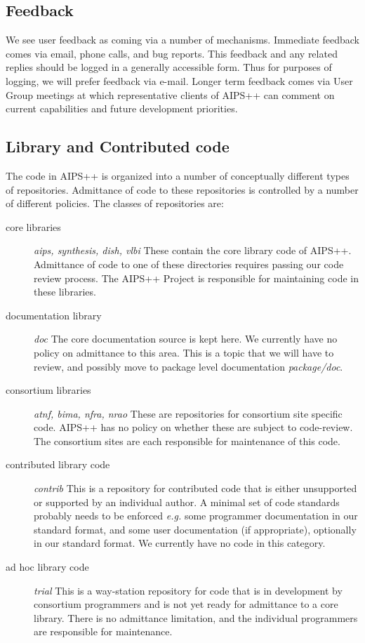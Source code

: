 \subsection{Feedback}

We see user feedback as coming via a number of mechanisms. Immediate
feedback comes via email, phone calls, and bug reports. This feedback
and any related replies should be logged in a generally accessible
form. Thus for purposes of logging, we will prefer feedback via
e-mail. Longer term feedback comes via User Group meetings at which
representative clients of AIPS++ can comment on current capabilities
and future development priorities.

\subsection{Library and Contributed code}

The code in AIPS++ is organized into a number of conceptually
different types of repositories. Admittance of code to these repositories
is controlled by a number of different policies. The classes of
repositories are:

\begin{description}
\item[core libraries] {\em aips, synthesis, dish, vlbi} These contain the core
library code of AIPS++. Admittance of code to one of these directories requires
passing our code review process. The AIPS++ Project is responsible for maintaining code
in these libraries.
\item[documentation library] {\em doc} The core documentation source is kept here.
We currently have no policy on admittance to this area. This is a topic that
we will  have to review, and possibly move to package level documentation
{\em package/doc}.
\item[consortium libraries] {\em atnf, bima, nfra, nrao} These are repositories for
consortium site specific code. AIPS++ has no policy on whether these are subject to
code-review. The consortium sites are each responsible for maintenance of this
code.
\item[contributed library code] {\em contrib} This is a repository for contributed
code that is either unsupported or supported by an individual author. A minimal
set of code standards probably needs to be enforced {\em e.g.} some programmer
documentation in our standard format, and some user documentation (if appropriate),
optionally in our standard format. We currently have no code in this category.
\item[ad hoc library code] {\em trial} This is a way-station repository for code that
is in development by consortium programmers and is not yet ready for
admittance to a core library. There is no admittance limitation, and
the individual programmers are responsible for maintenance.
\end{description}

